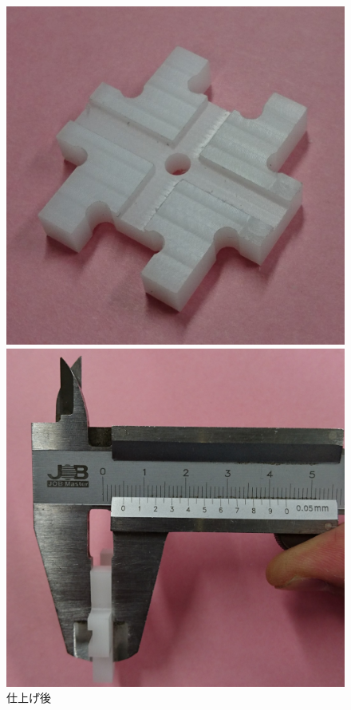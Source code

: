 \documentclass[b5paper, 9pt, twocolumn, titlepage,openany]{jsbook}%
\begin{document}
\begin{figure}[tbh]
  \begin{center}
    \begin{minipage}{0.7\columnwidth}
      \includegraphics[width=\columnwidth]{parts_isome.jpg}
    \end{minipage}
    \caption{仕上げ後\label{parts_nobari}}
    \begin{minipage}{0.7\columnwidth}
      \includegraphics[width=\columnwidth]{thickness.jpg}

\end{minipage}
\end{center}
\end{figure}
\end{document}
